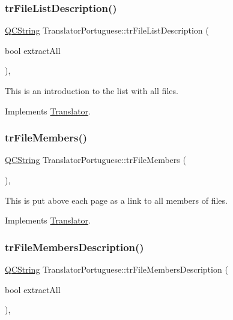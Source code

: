 \subsubsection{\texorpdfstring{trFileListDescription()}{trFileListDescription()}}
{\footnotesize\ttfamily \mbox{\hyperlink{class_q_c_string}{Q\+C\+String}} Translator\+Portuguese\+::tr\+File\+List\+Description (\begin{DoxyParamCaption}\item[{bool}]{extract\+All }\end{DoxyParamCaption})\hspace{0.3cm}{\ttfamily [inline]}, {\ttfamily [virtual]}}

This is an introduction to the list with all files. 

Implements \mbox{\hyperlink{class_translator}{Translator}}.

\mbox{\label{class_translator_portuguese_a96b28ed4a548d62f9350b576b5dba05f}} 
\subsubsection{\texorpdfstring{trFileMembers()}{trFileMembers()}}
{\footnotesize\ttfamily \mbox{\hyperlink{class_q_c_string}{Q\+C\+String}} Translator\+Portuguese\+::tr\+File\+Members (\begin{DoxyParamCaption}{ }\end{DoxyParamCaption})\hspace{0.3cm}{\ttfamily [inline]}, {\ttfamily [virtual]}}

This is put above each page as a link to all members of files. 

Implements \mbox{\hyperlink{class_translator}{Translator}}.

\mbox{\label{class_translator_portuguese_a444f40e7a8ab2d3c6167220ec3a43b46}} 
\subsubsection{\texorpdfstring{trFileMembersDescription()}{trFileMembersDescription()}}
{\footnotesize\ttfamily \mbox{\hyperlink{class_q_c_string}{Q\+C\+String}} Translator\+Portuguese\+::tr\+File\+Members\+Description (\begin{DoxyParamCaption}\item[{bool}]{extract\+All }\end{DoxyParamCaption})\hspace{0.3cm}{\ttfamily [inline]}, {\ttfamily [virtual]}}

